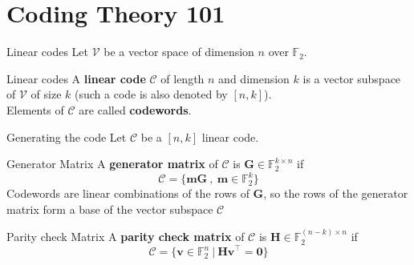 \section{Coding Theory 101}
\begin{frame}
    \sectionpage
\end{frame}

\begin{frame}{Linear codes}
    Let $\mathcal{V}$ be a vector space of dimension $n$ over $\mathds{F}_2$.
    \begin{block}{Linear codes}
        A \textbf{linear code} $\mathcal{C}$ of length $n$ and dimension $k$ is a
        vector subspace of $\mathcal{V}$ of size $k$ (such a code is also denoted by $[n, k]$).\\
        Elements of $\mathcal{C}$ are called \textbf{codewords}.
    \end{block}
\end{frame}

\begin{frame}{Generating the code}
    Let $\mathcal{C}$ be a $[n, k]$ linear code.
    \begin{block}{Generator Matrix}
         A \textbf{generator matrix} of $\mathcal{C}$ is ${\mathbf{G} \in \mathds{F}_{2}^{k\times n}}$ if
        \begin{equation*}
            \mathcal{C} = \lbrace \mathbf{mG} ~,~ \mathbf{m} \in \mathds{F}_{2}^{k} \rbrace
        \end{equation*}   
        Codewords are linear combinations of the rows of $\mathbf{G}$, so the rows of the generator matrix form a base of the vector subspace $\mathcal{C}$    
    \end{block}
    \begin{block}{Parity check Matrix}
        A \textbf{parity check matrix} of $\mathcal{C}$ is ${\mathbf{H} \in \mathds{F}_{2}^{(n-k)\times n}}$ if
       \begin{equation*}
           \mathcal{C} = \lbrace \mathbf{v} \in \mathds{F}_2^n ~|~ \mathbf{Hv}^\top = \mathbf{0} \rbrace
       \end{equation*}       
   \end{block}
\end{frame}


